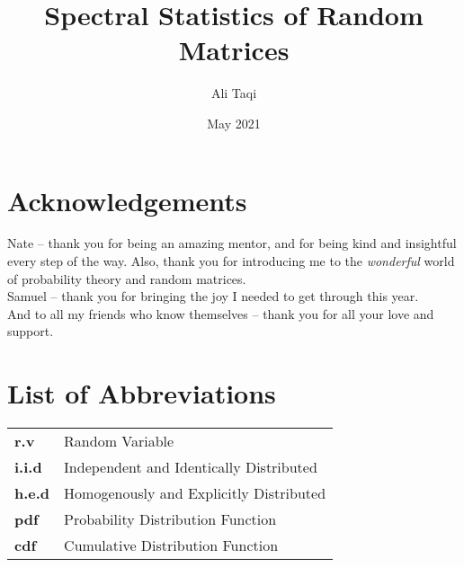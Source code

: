\documentclass[12pt,twoside]{reedthesis}
\title{Spectral Statistics of Random Matrices}
\author{Ali Taqi}
\date{May 2021}
\begin{document}
  \maketitle
  \frontmatter %
  \pagestyle{empty} %

     \chapter*{Acknowledgements}
 Nate -- thank you for being an amazing mentor, and for being kind and insightful every step of the way.
 Also, thank you for introducing me to the \textit{wonderful} world of probability theory and random matrices. \\

 \noindent Samuel -- thank you for bringing the joy I needed to get through this year. \\

 \noindent And to all my friends who know themselves -- thank you for all your love and support.


    \chapter*{List of Abbreviations}

	\begin{table}[h]
	\centering %
	\begin{tabular}{ll}
		\textbf{r.v}  	  &  Random Variable \\
		\textbf{i.i.d}  	&  Independent and Identically Distributed \\
		\textbf{h.e.d}    &  Homogenously and Explicitly Distributed \\
		\textbf{pdf}      &  Probability Distribution Function \\
		\textbf{cdf}      &  Cumulative Distribution Function \\
		\end{tabular}
	\end{table}

    \tableofcontents

    \listoftables \hfill
\end{document}
